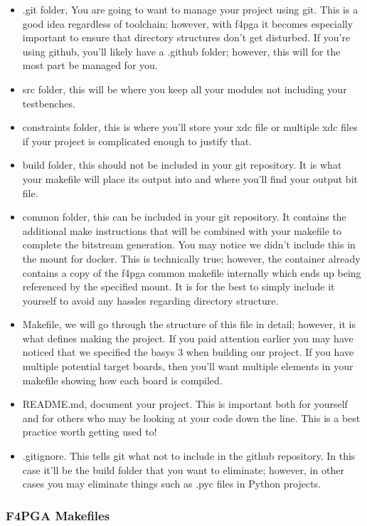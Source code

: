 \begin{itemize}
    \item .git folder, You are going to want to manage your project using git. 
    This is a good idea regardless of toolchain; however, with f4pga it becomes especially important to ensure that directory structures don't get disturbed.
    If you're using github, you'll likely have a .github folder; however, this will for the most part be managed for you. 

    \item src folder, this will be where you keep all your modules not including your testbenches. 

    \item constraints folder, this is where you'll store your xdc file or multiple xdc files if your project is complicated enough to justify that.

    \item build folder, this should not be included in your git repository. 
    It is what your makefile will place its output into and where you'll find your output bit file.

    \item common folder, this can be included in your git repository.
    It contains the additional make instructions that will be combined with your makefile to complete the bitstream generation. 
    You may notice we didn't include this in the mount for docker. 
    This is technically true; however, 
    the container already contains a copy of the f4pga common makefile internally which ends up being referenced by the specified mount. 
    It is for the best to simply include it yourself to avoid any hassles regarding directory structure. 

    \item Makefile, we will go through the structure of this file in detail; however, it is what defines making the project. 
    If you paid attention earlier you may have noticed that we specified the basys 3 when building our project. 
    If you have multiple potential target boards, then you'll want multiple elements in your makefile showing how each board is compiled.

    \item README.md, document your project. This is important both for yourself and for others who may be looking at your code down the line. 
    This is a best practice worth getting used to!

    \item .gitignore. This tells git what not to include in the github repository. 
    In this case it'll be the build folder that you want to eliminate; however, in other cases you may eliminate things such as .pyc files in Python projects. 
    
\end{itemize}

\subsubsection{F4PGA Makefiles}
